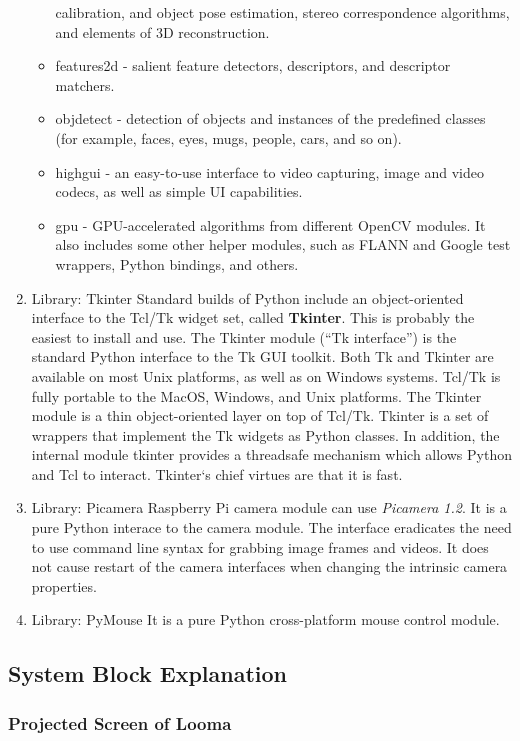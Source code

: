 \documentclass[12pt, a4paper]{article}
\begin{document}
\begin{enumerate}
\begin{itemize}
calibration, and object pose estimation, stereo correspondence algorithms, and
elements of 3D reconstruction.
\item features2d - salient feature detectors, descriptors, and descriptor matchers.
\item objdetect - detection of objects and instances of the predefined classes (for
example, faces, eyes, mugs, people, cars, and so on).
\item highgui - an easy-to-use interface to video capturing, image and video codecs, as
well as simple UI capabilities.
\item gpu - GPU-accelerated algorithms from different OpenCV modules.
It also includes some other helper modules, such as FLANN and Google test wrappers,
Python bindings, and others.
\end{itemize}
\item Library: Tkinter
Standard builds of Python include an object-oriented interface to the Tcl/Tk widget set,
called \textbf{Tkinter}. This is probably the easiest to install and use. The Tkinter module (“Tk
interface”) is the standard Python interface to the Tk GUI toolkit.
Both Tk and Tkinter are available on most Unix platforms, as well as on Windows
systems. Tcl/Tk is fully portable to the MacOS, Windows, and Unix platforms.
The Tkinter module is a thin object-oriented layer on top of Tcl/Tk. Tkinter is a set of
wrappers that implement the Tk widgets as Python classes. In addition, the internal module
tkinter provides a threadsafe mechanism which allows Python and Tcl to interact.
Tkinter‘s chief virtues are that it is fast.

\item Library: Picamera
Raspberry Pi camera module can use \emph{Picamera 1.2}. It is a pure Python interace to the camera module. The interface eradicates the need to use command line syntax for grabbing image frames and videos. It does not cause restart of the camera interfaces when changing the intrinsic camera properties. 
\item Library: PyMouse
It is a pure Python cross-platform mouse control module. 

\end{enumerate}

\subsection{System Block Explanation}
\subsubsection{Projected Screen of Looma}
\end{document}

